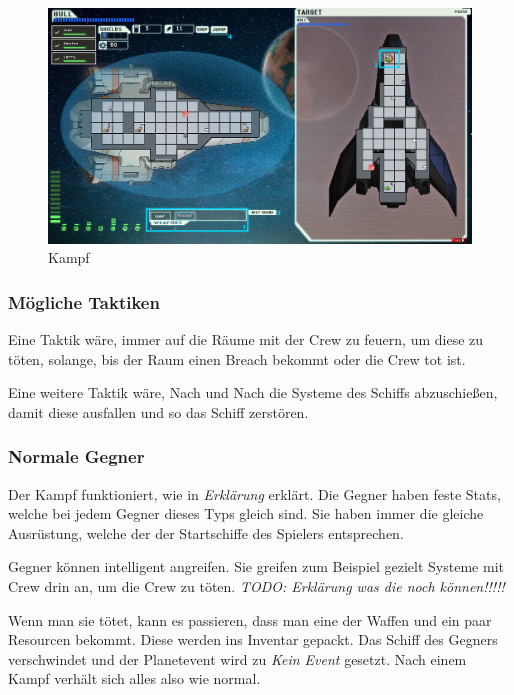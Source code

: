 \documentclass[fontsize=12pt,paper=a4,twoside]{scrartcl}
\begin{document}
\begin{figure}[H]
\centering
\includegraphics[width=1\linewidth]{DasSpiel/Kampf/fight.png}
\caption{Kampf}
\end{figure}

\subsubsection{Mögliche Taktiken}

Eine Taktik wäre, immer auf die Räume mit der Crew zu feuern, um diese zu töten, solange, bis der Raum einen Breach bekommt oder die Crew tot ist. 

Eine weitere Taktik wäre, Nach und Nach die Systeme des Schiffs abzuschießen, damit diese ausfallen und so das Schiff zerstören. 

\subsubsection{Normale Gegner}

Der Kampf funktioniert, wie in \textit{Erklärung} erklärt. Die Gegner haben feste Stats, welche bei jedem Gegner dieses Typs gleich sind. Sie haben immer die gleiche Ausrüstung, welche der der Startschiffe des Spielers entsprechen. 

Gegner können intelligent angreifen. Sie greifen zum Beispiel gezielt Systeme mit Crew drin an, um die Crew zu töten. \textit{TODO: Erklärung was die noch können!!!!!}

Wenn man sie tötet, kann es passieren, dass man eine der Waffen und ein paar Resourcen bekommt. Diese werden ins Inventar gepackt. Das Schiff des Gegners verschwindet und der Planetevent wird zu \textit{Kein Event} gesetzt. Nach einem Kampf verhält sich alles also wie normal. 
\end{document}
